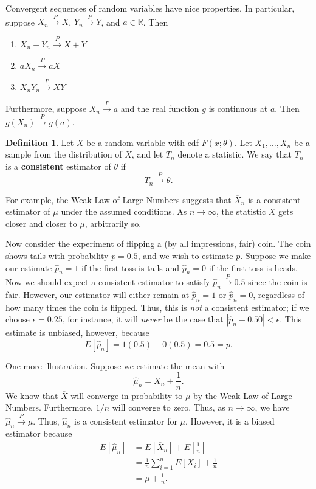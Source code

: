 \documentclass[12pt]{article}
\newcommand{\R}{\mathbb{R}}
\newcommand{\sumn}{\sum_{i=1}^n}
\newcommand{\xbar}{\overline{X}}
\newcommand{\cprob}{\overset{P}{\rightarrow}}
\theoremstyle{definition}
\newtheorem{definition}{Definition}
\begin{document}
Convergent sequences of random variables have nice properties. In particular, suppose $X_n \cprob X$, $Y_n \cprob Y$, and $a\in \R$. Then
\begin{enumerate}
	\item $X_n + Y_n \cprob X+Y$
	\item $aX_n \cprob aX$
	\item $X_nY_n \cprob XY$
\end{enumerate}
Furthermore, suppose $X_n \cprob a$ and the real function $g$ is continuous at $a$. Then $g(X_n) \cprob g(a)$. 

\begin{definition}
	Let $X$ be a random variable with cdf $F(x;\theta)$. Let $X_1, \hdots, X_n$ be a sample from the distribution of $X$, and let $T_n$ denote a statistic. We say that $T_n$ is a \textbf{consistent} estimator of $\theta$ if
		\[T_n \cprob \theta.	\]
\end{definition}

For example, the Weak Law of Large Numbers suggests that $\xbar_n$ is a consistent estimator of $\mu$ under the assumed conditions. As $n \rightarrow \infty$, the statistic $\xbar$ gets closer and closer to $\mu$, arbitrarily so.  

Now consider the experiment of flipping a (by all impressions, fair) coin. The coin shows tails with probability $p=0.5$, and we wish to estimate $p$. Suppose we make our estimate $\hat{p}_n=1$ if the first toss is tails and $\hat{p}_n=0$ if the first toss is heads. Now we should expect a consistent estimator to satisfy $\hat{p}_n \cprob 0.5$ since the coin is fair. However, our estimator will either remain at $\hat{p}_n=1$ or $\hat{p}_n=0$, regardless of how many times the coin is flipped. Thus, this is \emph{not} a consistent estimator; if we choose $\epsilon = 0.25$, for instance, it will \emph{never} be the case that $|\hat{p}_n - 0.50| < \epsilon$. This estimate is unbiased, however, because
	\[	E[\hat{p}_n] = 1(0.5) + 0(0.5) = 0.5 = p.\]

One more illustration. Suppose we estimate the mean with	
	\[\hat{\mu}_n = \xbar_n + \frac{1}{n}.	\]	
We know that $\xbar$ will converge in probability to $\mu$ by the Weak Law of Large Numbers. Furthermore, $1/n$ will converge to zero. Thus, as $n \rightarrow \infty$, we have $\hat{\mu}_n \cprob \mu$. Thus, $\hat{\mu}_n$ is a consistent estimator for $\mu$. However, it is a biased estimator because
\begin{align*}
	E[\hat{\mu}_n] &= E \left[\xbar_n \right] + E\left[\frac{1}{n} \right] \\
	&= \frac{1}{n} \sumn E[X_i] + \frac{1}{n} \\
	&= \mu + \frac{1}{n}.
\end{align*}
\end{document}

